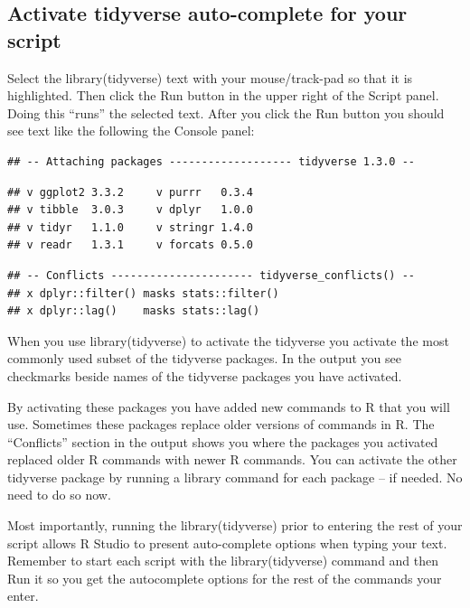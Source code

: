 \documentclass[
]{krantz}
\begin{document}
\hypertarget{activate-tidyverse-auto-complete-for-your-script}{%
\subsection{Activate tidyverse auto-complete for your script}\label{activate-tidyverse-auto-complete-for-your-script}}

Select the library(tidyverse) text with your mouse/track-pad so that it is highlighted. Then click the Run button in the upper right of the Script panel. Doing this ``runs'' the selected text. After you click the Run button you should see text like the following the Console panel:

\begin{verbatim}
## -- Attaching packages ------------------- tidyverse 1.3.0 --
\end{verbatim}

\begin{verbatim}
## v ggplot2 3.3.2     v purrr   0.3.4
## v tibble  3.0.3     v dplyr   1.0.0
## v tidyr   1.1.0     v stringr 1.4.0
## v readr   1.3.1     v forcats 0.5.0
\end{verbatim}

\begin{verbatim}
## -- Conflicts ---------------------- tidyverse_conflicts() --
## x dplyr::filter() masks stats::filter()
## x dplyr::lag()    masks stats::lag()
\end{verbatim}

When you use library(tidyverse) to activate the tidyverse you activate the most commonly used subset of the tidyverse packages. In the output you see checkmarks beside names of the tidyverse packages you have activated.

By activating these packages you have added new commands to R that you will use. Sometimes these packages replace older versions of commands in R. The ``Conflicts'' section in the output shows you where the packages you activated replaced older R commands with newer R commands. You can activate the other tidyverse package by running a library command for each package -- if needed. No need to do so now.

Most importantly, running the library(tidyverse) prior to entering the rest of your script allows R Studio to present auto-complete options when typing your text. Remember to start each script with the library(tidyverse) command and then Run it so you get the autocomplete options for the rest of the commands your enter.
\end{document}
